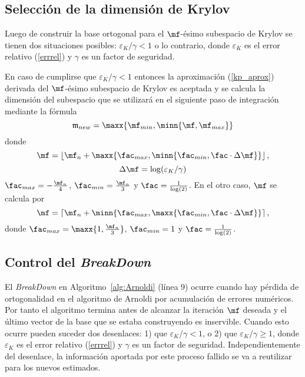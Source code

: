 \subsection{Selecci\'on  de la dimensi\'on de Krylov}\label{selkrydim}
Luego de construir la base ortogonal para el $\mf$-\'esimo subespacio de Krylov se tienen dos situaciones posibles: $\varepsilon_{K}/\gamma< 1$ o lo contrario, donde $\varepsilon_{K}$ es el error relativo (\ref{errrel}) y $\gamma$ es un factor de seguridad.

En caso de cumplirse que $\varepsilon_{K}/\gamma< 1$ entonces la aproximación (\ref{kp_aprox}) derivada del $\mf$-\'esimo subespacio de Krylov es aceptada y se calcula la dimensión del subespacio que se utilizará en el siguiente paso de integración mediante la fórmula
\begin{equation}
\mathfrak{m}_{new}= \maxx{\mf_{min}, \minn{\mf , \mf_{max} }}  \label{calcmnew}
\end{equation}
donde 	
\begin{equation*}
\mf = \left\lfloor \mf_{n} + \maxx{\fac_{max} , \minn{\fac_{min}, 
		\fac\cdot\Delta\mf} } \right\rfloor, 
\end{equation*}	
\begin{equation}
\Delta\mf=\log(\varepsilon_{K}/\gamma) \label{delta_m} 
\end{equation} 
$\fac_{max}= -\frac{\mf_n}{4}$, $\fac_{min}= \frac{\mf_n}{3}$ y $\fac=\frac{1}{\log(2)}$. En el otro caso, $\mf$ se calcula por    
\begin{equation*}
\mf = \left\lceil \mf_{n} + \minn{\fac_{max} , \maxx{\fac_{min}, 
		\fac\cdot\Delta\mf} } \right\rceil, 
\end{equation*}
donde $\fac_{max}= \maxx{ 1,\frac{\mf_{n}}{3} }$, $\fac_{min}= 1 $ y $\fac=\frac{1}{\log(2)}$.


\subsection{Control del \emph{BreakDown}}\label{brcontrol}
El \emph{BreakDown} en Algoritmo~\ref{alg:Arnoldi} (l\'inea $9$) ocurre cuando hay p\'erdida de ortogonalidad
en el algoritmo de Arnoldi por acumulaci\'on de errores num\'ericos. Por tanto el algoritmo termina antes de
alcanzar la iteración $\mf$ deseada y el \'ultimo vector de la base que se estaba construyendo es inservible. Cuando
esto ocurre pueden suceder dos desenlaces: 1) que $\varepsilon_{K}/\gamma< 1$, o 2) que $\varepsilon_{K}/\gamma \geq 1$, donde $\varepsilon_{K}$ es el error relativo (\ref{errrel}) y $\gamma$ es un factor de seguridad. Independientemente del desenlace, la información aportada por este
proceso fallido se va a reutilizar para los nuevos estimados.

